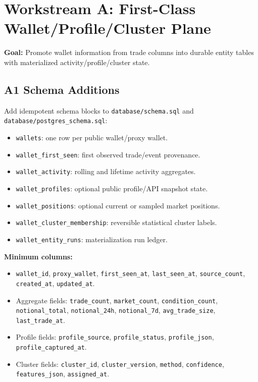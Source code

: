 \documentclass{article}
\begin{document}
\section*{Workstream A: First-Class Wallet/Profile/Cluster Plane}
\textbf{Goal:} Promote wallet information from trade columns into durable entity tables with materialized activity/profile/cluster state.

\subsection*{A1 Schema Additions}
Add idempotent schema blocks to \texttt{database/schema.sql} and \texttt{database/postgres\_schema.sql}:
\begin{itemize}[nosep]
\item \texttt{wallets}: one row per public wallet/proxy wallet.
\item \texttt{wallet\_first\_seen}: first observed trade/event provenance.
\item \texttt{wallet\_activity}: rolling and lifetime activity aggregates.
\item \texttt{wallet\_profiles}: optional public profile/API snapshot state.
\item \texttt{wallet\_positions}: optional current or sampled market positions.
\item \texttt{wallet\_cluster\_membership}: reversible statistical cluster labels.
\item \texttt{wallet\_entity\_runs}: materialization run ledger.
\end{itemize}

\textbf{Minimum columns:}
\begin{itemize}[nosep]
\item \texttt{wallet\_id}, \texttt{proxy\_wallet}, \texttt{first\_seen\_at}, \texttt{last\_seen\_at}, \texttt{source\_count}, \texttt{created\_at}, \texttt{updated\_at}.
\item Aggregate fields: \texttt{trade\_count}, \texttt{market\_count}, \texttt{condition\_count}, \texttt{notional\_total}, \texttt{notional\_24h}, \texttt{notional\_7d}, \texttt{avg\_trade\_size}, \texttt{last\_trade\_at}.
\item Profile fields: \texttt{profile\_source}, \texttt{profile\_status}, \texttt{profile\_json}, \texttt{profile\_captured\_at}.
\item Cluster fields: \texttt{cluster\_id}, \texttt{cluster\_version}, \texttt{method}, \texttt{confidence}, \texttt{features\_json}, \texttt{assigned\_at}.
\end{itemize}
\end{document}

